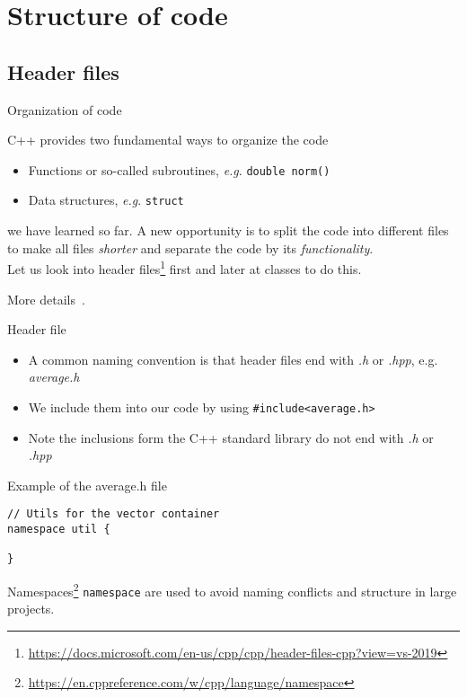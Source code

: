 \documentclass[\classoption]{beamer}
\begin{document}
\section{Structure of code}


\subsection{Header files}

\begin{frame}{Organization of code}
\begin{block}{C++ provides two fundamental ways to organize the code}
\begin{itemize}
\item Functions or so-called subroutines, \emph{e.g}. \lstinline|double norm()|
\item Data structures, \emph{e.g}. \lstinline|struct|
\end{itemize}
\end{block}
we have learned so far. A new opportunity is to split the code into different files to make all files \textit{shorter} and separate the code by its \textit{functionality}. \\
\vspace{0.25cm}
Let us look into header files\footnote{\tiny\url{https://docs.microsoft.com/en-us/cpp/cpp/header-files-cpp?view=vs-2019}} first and later at classes to do this.

More details~\cite{hunt1900pragmatic,sommerville2011software}.

\end{frame}

\begin{frame}[fragile]{Header file}
\begin{itemize}
\item A common naming convention is that header files end with \textit{.h} or \textit{.hpp}, e.g. \textit{average.h}
\item We include them into our code by using \lstinline|#include<average.h>|
\item Note the inclusions form the C++ standard library do not end with \textit{.h} or \textit{.hpp}
\end{itemize}

\begin{block}{Example of the average.h file}
\begin{lstlisting}
// Utils for the vector container
namespace util {

}
\end{lstlisting}
\end{block}
Namespaces\footnote{\tiny\url{https://en.cppreference.com/w/cpp/language/namespace}} \lstinline|namespace| are used to avoid naming conflicts
and structure in large projects.
\end{frame}
\end{document}
